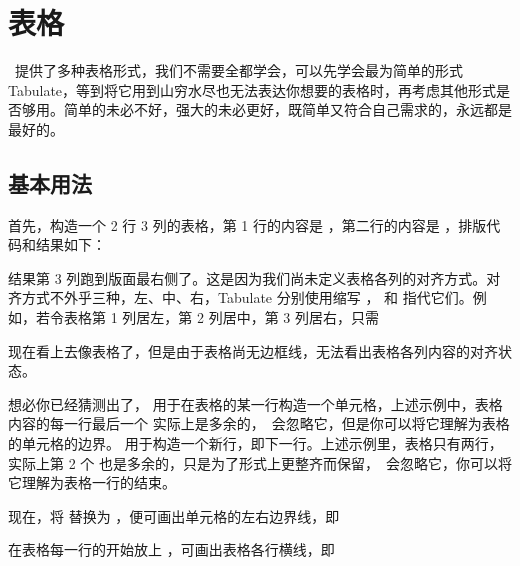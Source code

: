 \chapter{表格}

\ConTeXt\ 提供了多种表格形式，我们不需要全都学会，可以先学会最为简单的形式 Tabulate，等到将它用到山穷水尽也无法表达你想要的表格时，再考虑其他形式是否够用。简单的未必不好，强大的未必更好，既简单又符合自己需求的，永远都是最好的。

\section{基本用法}

首先，构造一个 2 行 3 列的表格，第 1 行的内容是 ，第二行的内容是 ，排版代码和结果如下：

\startsample
\starttabulate
{}  \NC\NR
{}  \NC\NR
\stoptabulate
\stopsample
\simplesample[option=TEX]{\null}
\getsample

\noindent 结果第 3 列跑到版面最右侧了。这是因为我们尚未定义表格各列的对齐方式。对齐方式不外乎三种，左、中、右，Tabulate 分别使用缩写 ， 和  指代它们。例如，若令表格第 1 列居左，第 2 列居中，第 3 列居右，只需

\startsample
\starttabulate[|l|c|r|]
  \NC\NR
{}  \NC\NR
\stoptabulate
\stopsample
\simplesample[option=TEX]{\getsample}
\noindent 现在看上去像表格了，但是由于表格尚无边框线，无法看出表格各列内容的对齐状态。

想必你已经猜测出了，\type{\NC} 用于在表格的某一行构造一个单元格，上述示例中，表格内容的每一行最后一个 \type{\NC} 实际上是多余的，\ConTeXt\ 会忽略它，但是你可以将它理解为表格的单元格的边界。\type{\NR} 用于构造一个新行，即下一行。上述示例里，表格只有两行，实际上第 2 个 \type{\NR} 也是多余的，只是为了形式上更整齐而保留，\ConTeXt\ 会忽略它，你可以将它理解为表格一行的结束。

现在，将 \type{\NC} 替换为 \type{\VL}，便可画出单元格的左右边界线，即

\startsample
\starttabulate[|l|c|r|]
  \VL\NR
{}  \VL\NR
\stoptabulate
\stopsample
\simplesample[option=TEX]{\getsample}

\noindent 在表格每一行的开始放上 \type{\HL}，可画出表格各行横线，即

\startsample
\starttabulate[|l|c|r|]
\HL
{}  \VL\NR
\HL
{}  \VL\NR
\HL
\stoptabulate
\stopsample
\simplesample[option=TEX]{\getsample}

